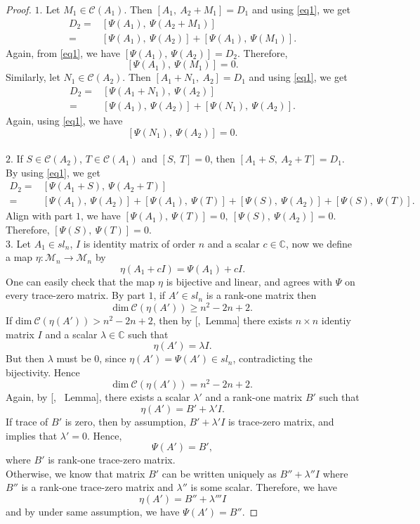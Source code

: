 \documentclass{amsart}
\theoremstyle{definition}
\theoremstyle{remark}
\numberwithin{equation}{section}
\begin{document}
\begin{proof} $1.$
     Let $M_1 \in \mathcal{C}(A_1)$. Then $[A_1,~A_2+M_1]=D_1$ and using \ref{eq1}, we get
     \begin{align*}
         D_2=&[\Psi(A_1),~\Psi(A_2+M_1)]\\
          =&[\Psi(A_1),~\Psi(A_2)]+[\Psi(A_1),~\Psi(M_1)].
     \end{align*}
     Again, from \ref{eq1}, we have $[\Psi(A_1),~\Psi(A_2)]=D_2$. Therefore, $$[\Psi(A_1),~\Psi(M_1)]=0.$$
     Similarly, let $N_1 \in \mathcal{C}(A_2)$. Then $[A_1+N_1,~A_2]=D_1$ and using \ref{eq1}, we get
     \begin{align*}
         D_2=&[\Psi(A_1+N_1),~\Psi(A_2)]\\
          =&[\Psi(A_1),~\Psi(A_2)]+[\Psi(N_1),~\Psi(A_2)].
     \end{align*}
     Again, using \ref{eq1}, we have $$[\Psi(N_1),~\Psi(A_2)]=0.$$\\
	$2.$ If $S \in \mathcal{C}(A_2)$, $T \in \mathcal{C}(A_1)$ and $[S,~T]=0$, then $[A_1+S,~A_2+T]=D_1$. By using \ref{eq1}, we get
    \begin{align*}
         D_2=&[\Psi(A_1+S),~\Psi(A_2+T)]\\
          =&[\Psi(A_1),~\Psi(A_2)]+[\Psi(A_1),~\Psi(T)]+[\Psi(S),~\Psi(A_2)]+[\Psi(S),~\Psi(T)].
     \end{align*}
     Align with part $1$, we have $[\Psi(A_1),~\Psi(T)]=0,~[\Psi(S),~\Psi(A_2)]=0$. Therefore, $[\Psi(S),~\Psi(T)]=0.$\\
     $3.$ %
     Let $A_1 \in sl_n$, $I$ is identity matrix of order $n$ and a scalar $c \in \mathbb{C}$, now we define a map $\eta: \mathscr{M}_n \to \mathscr{M}_n$ by $$\eta(A_1+cI)=\Psi(A_1)+cI.$$ One can easily check that the map $\eta$ is bijective and linear, and agrees with $\Psi$ on every trace-zero matrix. By part $1$, if $A' \in sl_n$ is a rank-one matrix then $$\text{dim}~\mathcal{C}(\eta(A')) \geq n^2-2n+2.$$ If $\text{dim}~\mathcal{C}(\eta(A')) > n^2-2n+2$, then by [\cite{wat},~Lemma] there exists $n \times n$ identiy matrix $I$ and a scalar $\lambda \in \mathbb{C}$ such that $$\eta(A')=\lambda I.$$ But then $\lambda$ must be $0$, since $\eta(A')=\Psi(A') \in sl_n$, contradicting the bijectivity. Hence $$\text{dim}~\mathcal{C}(\eta(A')) = n^2-2n+2.$$ Again, by [\cite{wat}, ~Lemma], there exists a scalar $\lambda'$ and a rank-one matrix $B'$ such that $$\eta(A')=B'+\lambda'I.$$ If trace of $B'$ is zero, then by assumption, $B'+\lambda'I$ is trace-zero matrix, and implies that $\lambda'=0$. Hence, $$\Psi(A')=B',$$ where $B'$ is rank-one trace-zero matrix.\\
     Otherwise, we know that matrix $B'$ can be written uniquely as $B''+\lambda''I$ where $B''$ is a rank-one trace-zero matrix and $\lambda''$  is some scalar. Therefore, we have $$\eta(A')=B''+\lambda'''I$$ and by under same assumption, we have $\Psi(A')=B''$.
\end{proof}
\end{document}
